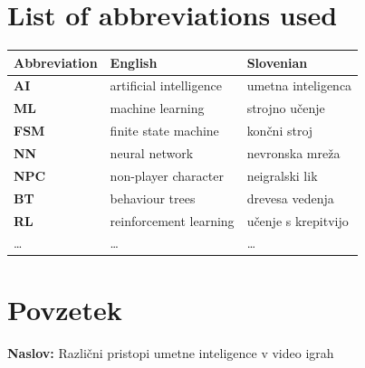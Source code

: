 \documentclass[a4paper, 12pt]{book}
\newcommand{\ttitle}{Različni pristopi umetne inteligence v video igrah}
\newcommand{\clearemptydoublepage}{\newpage{\pagestyle{empty}\cleardoublepage}}
\begin{document}
\chapter*{List of abbreviations used}  %

\noindent\begin{tabular}{p{}|p{}|p{}}    %
  {\bf Abbreviation} & {\bf English} & {\bf Slovenian} \\ \hline
  {\bf AI}      & artificial intelligence           & umetna inteligenca \\
  {\bf ML}      & machine learning                  & strojno učenje \\
  {\bf FSM}     & finite state machine              & končni stroj \\
  {\bf NN}      & neural network                    & nevronska mreža \\
  {\bf NPC}     & non-player character              & neigralski lik \\
  {\bf BT }     & behaviour trees                   & drevesa vedenja \\
  {\bf RL }     & reinforcement learning            & učenje s krepitvijo \\
  \dots         & \dots                             & \dots \\
\end{tabular}

\clearemptydoublepage


\chapter*{Povzetek}

\noindent\textbf{Naslov:} \ttitle
\bigskip
\end{document}
